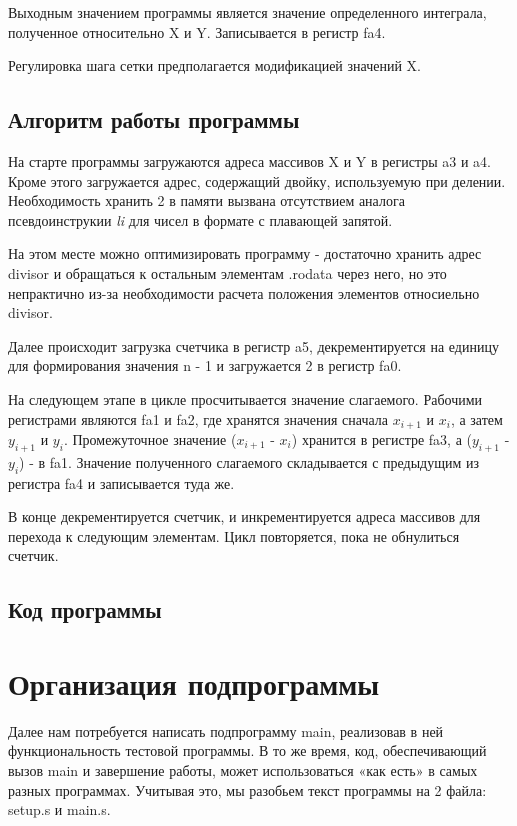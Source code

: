 Выходным значением программы является значение определенного интеграла, полученное относительно X и Y. Записывается в регистр fa4.

Регулировка шага сетки предполагается модификацией значений X.

\subsection{Алгоритм работы программы}
На старте программы загружаются адреса массивов X и Y в регистры a3 и a4. Кроме этого загружается адрес, содержащий двойку, используемую при делении. Необходимость хранить 2 в памяти вызвана отсутствием аналога псевдоинструкии \textit{li} для чисел в формате с плавающей запятой.

На этом месте можно оптимизировать программу - достаточно хранить адрес divisor и обращаться к остальным элементам .rodata через него, но это непрактично из-за необходимости расчета положения элементов относиельно divisor.

Далее происходит загрузка счетчика в регистр a5, декрементируется на единицу для формирования значения n - 1 и загружается 2 в регистр fa0.

На следующем этапе в цикле просчитывается значение слагаемого. Рабочими регистрами являются fa1 и fa2, где хранятся значения сначала $x_{i+1}$ и $x_i$, а затем $y_{i+1}$ и $y_i$. Промежуточное значение ($x_{i+1}$ - $x_i$) хранится в регистре fa3, а ($y_{i+1}$ - $y_i$) - в fa1. Значение полученного слагаемого складывается с предыдущим из регистра fa4 и записывается туда же.

В конце декрементируется счетчик, и инкрементируется адреса массивов для перехода к следующим элементам. Цикл повторяется, пока не обнулиться счетчик.

\subsection{Код программы}

\parindent=1cm %

\section{Организация подпрограммы}
Далее нам потребуется написать подпрограмму main, реализовав в ней функциональность тестовой программы. В то же время, код, обеспечивающий вызов main и завершение работы, может использоваться «как есть» в самых разных программах. Учитывая это, мы разобьем текст программы на 2 файла: setup.s и main.s.

